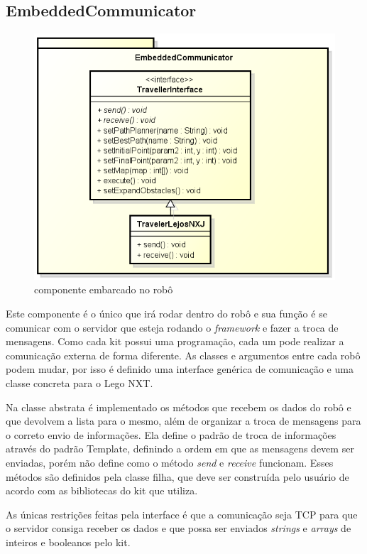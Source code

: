 \subsection{EmbeddedCommunicator}

\begin{figure}[h]
	\centering
	\label{fig23}
		\includegraphics[keepaspectratio=true,scale=0.6]{figuras/embedded.png}
	\caption{componente embarcado no robô}
\end{figure}

Este componente é o único que irá rodar dentro do robô e sua função é se comunicar com o servidor que esteja rodando o \textit{framework} e fazer a troca de mensagens. Como cada kit possui uma programação, cada um pode realizar a comunicação externa de forma diferente. As classes e argumentos entre cada robô podem mudar, por isso é definido uma interface genérica de comunicação e uma classe concreta para o Lego NXT. 

Na classe abstrata é implementado os métodos que recebem os dados do robô e que devolvem a lista para o mesmo, além de organizar a troca de mensagens para o correto envio de informações. Ela define o padrão de troca de informações através do padrão Template, definindo a ordem em que as mensagens devem ser enviadas, porém não define como o método \textit{send} e \textit{receive} funcionam. Esses métodos são definidos pela classe filha, que deve ser construída pelo usuário de acordo com as bibliotecas do kit que utiliza.

As únicas restrições feitas pela interface é que a comunicação seja TCP para que o servidor consiga receber os dados e que possa ser enviados \textit{strings} e \textit{arrays} de inteiros e booleanos pelo kit.

